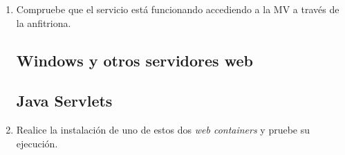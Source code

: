 \documentclass[paper=a4, fontsize=11pt]{scrartcl} %
\numberwithin{equation}{section} %
\numberwithin{figure}{section} %
\numberwithin{table}{section} %
\begin{document}
\begin{enumerate}
\begin{itemize}
			\item Al igual que WildFly, GlassFish es un servidor de aplicaciones implementado en Java
			en código abierto y desarrollado por \textit{Oracle Corporation} bajo una licencia dual
			\href{https://opensource.org/licenses/CDDL-1.0}{\textbf{Common Development and Distribution
			License (CDDL)}}\footnote{En este enlace, no he usado el oficial, es decir, el de Oracle
			porque me dio la sensación de que dirigía a un archivo temporal pero lo dejo aquí:
			\href{http://www.oracle.com/technetwork/middleware/oedq/help/edq11help-2152391.pdf}{\textbf{CDDL}}}
			\& \href{https://www.gnu.org/licenses/gpl.html}{\textbf{GPL}}
			con una ligera modificación.\cite{GF_official}\cite{GF_install}
		\end{itemize}
		
	\subsection{Windows: IIS}
		\item Compruebe que el servicio está funcionando accediendo a la MV a través de la anfitriona.
	\subsection{Windows y otros servidores web}
	\subsection{Java Servlets}
		\item Realice la instalación de uno de estos dos \textit{web containers} y pruebe su ejecución.
		

\end{enumerate}
\end{document}
